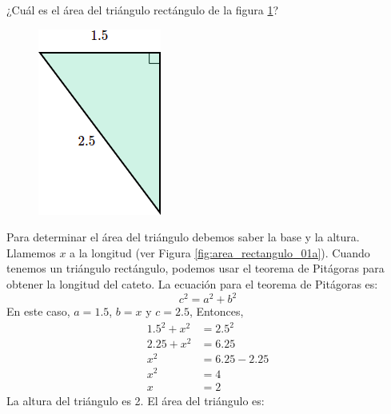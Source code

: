 ¿Cuál es el área del triángulo rectángulo de la figura \ref{fig:area_rectangulo_01}?

\begin{figure}[H]
    \centering
    \includegraphics[width=0.15\linewidth]{../images/area_rectangulo_01.png}
    \caption{}
    \label{fig:area_rectangulo_01}
\end{figure}
\begin{solutionbox}{14cm}

    \begin{minipage}{0.6\textwidth}
        Para determinar el área del triángulo debemos saber la base y la altura. Llamemos $x$ a la longitud (ver Figura \ref{fig:area_rectangulo_01a}).
        Cuando tenemos un triángulo rectángulo, podemos usar el teorema de Pitágoras para obtener la longitud del cateto.
        La ecuación para el teorema de Pitágoras es:
        \[c^2=a^2+b^2\]
        En este caso, $a=1.5$, $b=x$ y $c=2.5$, Entonces,
        \begin{align*}
            1.5^2+x^2 & =2.5^2     \\
            2.25+x^2  & =6.25      \\
            x^2       & =6.25-2.25 \\
            x^2       & =4         \\
            x         & =2
        \end{align*}
        La altura del triángulo es 2. El área del triángulo es:


\end{minipage}
\end{solutionbox}
